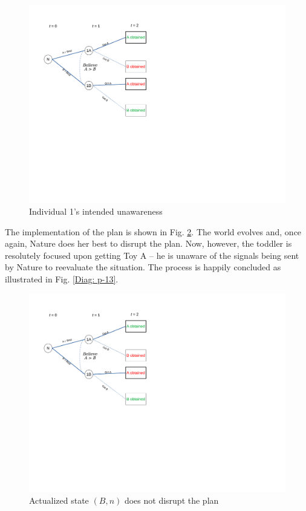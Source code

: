 \documentclass[
11pt,
titlepage,
reqno,
]{article}%
\theoremstyle{definition}
\begin{document}
\begin{figure}[h!]
	\centering
	\includegraphics*[page=11,trim = 0in 4in 3in 0in,scale=.65]{Awareness_Diagrams_All}
	\caption{Individual 1's intended unawareness\label{Diag: p-11}}%
\end{figure}

The implementation of the plan is shown in Fig. \ref{Diag: p-12}. The world evolves and, once again, Nature does her best to disrupt the plan. Now, however, the toddler is resolutely focused upon getting Toy A -- he is unaware of the signals being sent by Nature to reevaluate the situation. The process is happily concluded as illustrated in Fig. \ref{Diag: p-13}.

\begin{figure}[h!]
	\centering
	\includegraphics*[page=12,trim = 0in 5in 3in 0in,scale=.65]{Awareness_Diagrams_All}
	\caption{Actualized state $(B,n)$ does not disrupt the plan\label{Diag: p-12}}%
\end{figure}
\end{document}
